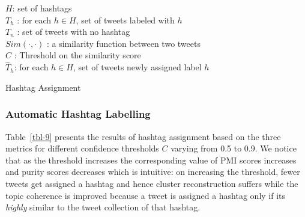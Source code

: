 \documentclass[10pt,a5paper,twoside]{article}
\begin{document}
\vspace{-4mm}
\incmargin{1.5em}
\linesnumbered
\begin{algorithm}[hb!]
\dontprintsemicolon

\Input
{
$H$: set of hashtags \\
$T_h$ : for each $h \in H$, set of tweets labeled with $h$ \\
$T_n$ : set of tweets with no hashtag \\
$\mathit{Sim}(\cdot,\cdot)$ : a similarity function between two tweets\\
$C$ : Threshold on the similarity score\\
}
\Output
{
$\hat{T}_h$: for each $h \in H$, set of tweets newly assigned label $h$\\
}
\vspace{-1mm}
\caption{{\sc Hashtag Assignment} \label{alg-1}}
\end{algorithm}
\decmargin{1.5em}


\subsubsection{Automatic Hashtag Labelling}

Table~\ref{tbl-9} presents the results of hashtag assignment based on
the three metrics for different confidence thresholds $C$ varying from
0.5 to 0.9. We notice that as the threshold increases the
corresponding value of PMI scores increases and purity scores
decreases which is intuitive: on increasing the threshold, fewer 
tweets get assigned a hashtag and hence cluster
reconstruction suffers while the topic coherence is improved because a
tweet is assigned a hashtag only if its \emph{highly} similar to the tweet
collection of that hashtag.
\end{document}
